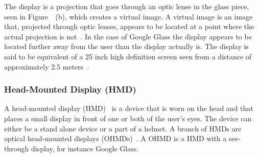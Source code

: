 The display is a projection that goes through an optic lense in the glass piece, seen in Figure~\label{GoogleGlassHardware}~(b), which creates a virtual image. A virtual image is an image that, projected through optic lenses, appears to be located at a point where the actual projection is not~\cite{virtualImageWiki}. In the case of Google Glass the display appears to be located further away from the user than the display actually is. The display is said to be equivalent of a 25 inch high definition screen seen from a distance of approximately 2.5 meters~\cite{GlassSpecs}.

%
%
%
%
%
%
%
%	
%	
%	
%
%
%
%
%
%
%
%
\subsubsection{Head-Mounted Display (HMD)}
\label{subsubsec:hmd}
A head-mounted display (HMD)~\cite{hmdWiki} is a device that is worn on the head and that places a small display in front of one or both of the user's eyes. The device can either be a stand alone device or a part of a helmet. A branch of HMDs are optical head-mounted displays (OHMDs)~\cite{ohmdWiki}. A OHMD is a HMD with a see-through display, for instance Google Glass.

